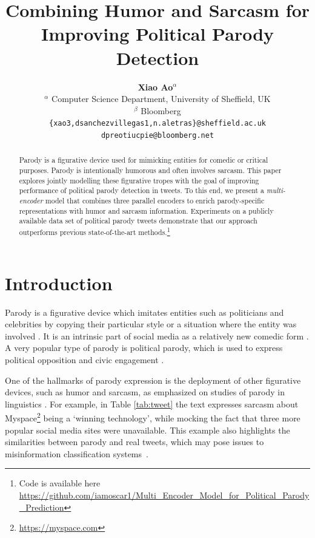 \documentclass[11pt]{article}
\title{Combining Humor and Sarcasm for Improving Political Parody Detection}
\author{
    {\bf Xiao Ao$^\alpha$} \quad {\bf Danae S\'{a}nchez Villegas$^\alpha$} \quad {\bf Daniel Preo\c{t}iuc-Pietro$^\beta$} \quad {\bf Nikolaos Aletras$^\alpha$}\\
    $^\alpha$ Computer Science Department, University of Sheffield, UK\\
    $^\beta$ Bloomberg\\
    {\small
    {\tt \{xao3,dsanchezvillegas1,n.aletras\}@sheffield.ac.uk}}\\
    {\small
    {\tt dpreotiucpie@bloomberg.net}}
}
\begin{document}
\maketitle

\begin{abstract}
Parody is a figurative device used for mimicking entities for comedic or critical purposes. Parody is intentionally humorous and often involves sarcasm. This paper explores jointly modelling these figurative tropes with the goal of improving performance of political parody detection in tweets.  To this end, we present a \emph{multi-encoder} model that combines three parallel encoders to enrich parody-specific representations with humor and sarcasm information. Experiments on a publicly available data set of political parody tweets demonstrate that our approach outperforms previous state-of-the-art methods.\footnote{Code is available here \url{https://github.com/iamoscar1/Multi_Encoder_Model_for_Political_Parody_Prediction}} %
\end{abstract}

\section{Introduction}

Parody is a figurative device which imitates entities such as politicians and celebrities by copying their particular style or a situation where the entity was involved \citep{rose1993parody}. It is an intrinsic part of social media as a relatively new comedic form \cite{TweetReporting}. A very popular type of parody is political parody, which is used to express political opposition and civic engagement \citep{davis2018seriously}.

One of the hallmarks of parody expression is the deployment of other figurative devices, such as humor and sarcasm, as emphasized on studies of parody in linguistics \citep{haiman1998talk,Parody_Humor}. For example, in Table \ref{tab:tweet} the text expresses sarcasm about Myspace\footnote{\url{https://myspace.com}} %
being a \lq winning technology\rq, while mocking the fact that three more popular social media sites were unavailable. This example also highlights the similarities between parody and real tweets, which may pose issues to misinformation classification systems~\cite{mu2020identifying}.
\end{document}
